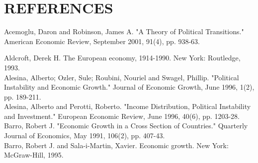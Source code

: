 \documentclass[10pt]{article}
\begin{document}
\section*{REFERENCES}
Acemoglu, Daron and Robinson, James A. "A Theory of Political Transitions." American Economic Review, September 2001, 91(4), pp. 938-63.

Aldcroft, Derek H. The European economy, 1914-1990. New York: Routledge, 1993.\\
Alesina, Alberto; Ozler, Sule; Roubini, Nouriel and Swagel, Phillip. "Political Instability and Economic Growth." Journal of Economic Growth, June 1996, 1(2), pp. 189-211.\\
Alesina, Alberto and Perotti, Roberto. "Income Distribution, Political Instability and Investment." European Economic Review, June 1996, 40(6), pp. 1203-28.\\
Barro, Robert J. "Economic Growth in a Cross Section of Countries." Quarterly Journal of Economics, May 1991, 106(2), pp. 407-43.\\
Barro, Robert J. and Sala-i-Martin, Xavier. Economic growth. New York: McGraw-Hill, 1995.
\end{document}
